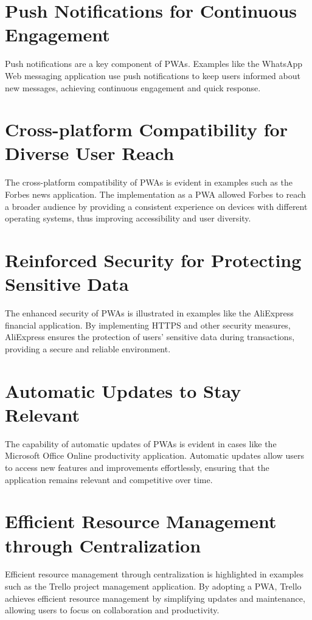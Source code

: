\documentclass[journal]{IEEEtran}
\begin{document}
	\section*{Push Notifications for Continuous Engagement}
	Push notifications are a key component of PWAs. Examples like the WhatsApp Web messaging application use push notifications to keep users informed about new messages, achieving continuous engagement and quick response.
	
	\section*{Cross-platform Compatibility for Diverse User Reach}
	The cross-platform compatibility of PWAs is evident in examples such as the Forbes news application. The implementation as a PWA allowed Forbes to reach a broader audience by providing a consistent experience on devices with different operating systems, thus improving accessibility and user diversity.
	
	\section*{Reinforced Security for Protecting Sensitive Data}
	The enhanced security of PWAs is illustrated in examples like the AliExpress financial application. By implementing HTTPS and other security measures, AliExpress ensures the protection of users' sensitive data during transactions, providing a secure and reliable environment.
	
	\section*{Automatic Updates to Stay Relevant}
	The capability of automatic updates of PWAs is evident in cases like the Microsoft Office Online productivity application. Automatic updates allow users to access new features and improvements effortlessly, ensuring that the application remains relevant and competitive over time.
	
	\section*{Efficient Resource Management through Centralization}
	Efficient resource management through centralization is highlighted in examples such as the Trello project management application. By adopting a PWA, Trello achieves efficient resource management by simplifying updates and maintenance, allowing users to focus on collaboration and productivity.
	
\end{document}
